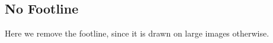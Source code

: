 \begingroup
{}
\subsection{No Footline}
\begin{iframe}
    Here we remove the footline, since it is drawn on large images otherwise. 
\end{iframe}
\endgroup